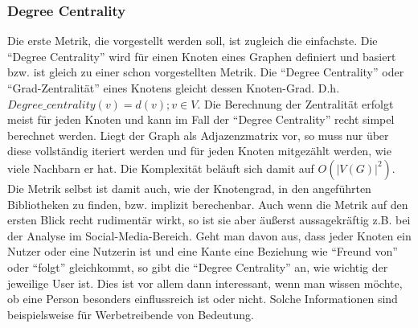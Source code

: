\documentclass[a4paper,12pt,ngerman,chapterprefix=false,listof=totoc,bibliography=totoc]{scrreprt}
\begin{document}
\subsubsection*{Degree Centrality}
{
Die erste Metrik, die vorgestellt werden soll, ist zugleich die einfachste. Die "`Degree Centrality"' wird für einen Knoten eines Graphen definiert und basiert bzw. ist gleich zu einer schon vorgestellten Metrik. Die "`Degree Centrality"' oder "`Grad-Zentralität"' eines Knotens gleicht dessen Knoten-Grad. D.h. \(Degree\_centrality(v) = d(v); v \in V\). Die Berechnung der Zentralität erfolgt meist für jeden Knoten und kann im Fall der "`Degree Centrality"' recht simpel berechnet werden. Liegt der Graph als Adjazenzmatrix vor, so muss nur über diese vollständig iteriert werden und für jeden Knoten mitgezählt werden, wie viele Nachbarn er hat. Die Komplexität beläuft sich damit auf \(O(|V(G)|^2)\). Die Metrik selbst ist damit auch, wie der Knotengrad, in den angeführten Bibliotheken zu finden, bzw. implizit berechenbar.  Auch wenn die Metrik auf den ersten Blick recht rudimentär wirkt, so ist sie aber äußerst aussagekräftig z.B. bei der Analyse im Social-Media-Bereich. Geht man davon aus, dass jeder Knoten ein Nutzer oder eine Nutzerin ist und eine Kante eine Beziehung wie "`Freund von"' oder "`folgt"' gleichkommt, so gibt die "`Degree Centrality"' an, wie wichtig der jeweilige User ist. Dies ist vor allem dann interessant, wenn man wissen möchte, ob eine Person besonders einflussreich ist oder nicht. Solche Informationen sind beispielsweise für Werbetreibende von Bedeutung. \cite{bhasin_graph_2019}
}
\end{document}

